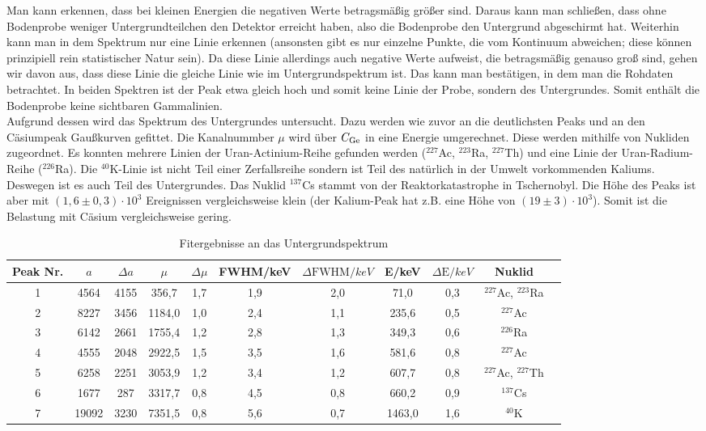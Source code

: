 Man kann erkennen, dass bei kleinen Energien die negativen Werte betragsmäßig größer sind. Daraus kann man schließen, dass ohne Bodenprobe weniger Untergrundteilchen den Detektor erreicht haben, also die Bodenprobe den Untergrund abgeschirmt hat. Weiterhin kann man in dem Spektrum nur eine Linie erkennen (ansonsten gibt es nur einzelne Punkte, die vom Kontinuum abweichen; diese können prinzipiell rein statistischer Natur sein). Da diese Linie allerdings auch negative Werte aufweist, die betragsmäßig genauso groß sind, gehen wir davon aus, dass diese Linie die gleiche Linie wie im Untergrundspektrum ist. Das kann man bestätigen, in dem man die Rohdaten betrachtet. In beiden Spektren ist der Peak etwa gleich hoch und somit keine Linie der Probe, sondern des Untergrundes. Somit enthält die Bodenprobe keine sichtbaren Gammalinien.\\

Aufgrund dessen wird das Spektrum des Untergrundes untersucht. Dazu werden wie zuvor an die deutlichsten Peaks und an den Cäsiumpeak Gaußkurven gefittet. Die Kanalnummber $\mu$ wird über $C_\mathrm{Ge}$ in eine Energie umgerechnet. Diese werden mithilfe von \cite{lara} Nukliden zugeordnet. Es konnten mehrere Linien der Uran-Actinium-Reihe gefunden werden ($^{227}$Ac, $^{223}$Ra, $^{227}$Th) und eine Linie der Uran-Radium-Reihe ($^{226}$Ra). Die $^{40}$K-Linie ist nicht Teil einer Zerfallsreihe sondern ist Teil des natürlich in der Umwelt vorkommenden Kaliums. Deswegen ist es auch Teil des Untergrundes. Das Nuklid $^{137}$Cs stammt von der Reaktorkatastrophe in Tschernobyl. Die Höhe des Peaks ist aber mit $(1,6 \pm 0,3) \cdot 10^3$ Ereignissen vergleichsweise klein (der Kalium-Peak hat z.B. eine Höhe von $(19 \pm 3)\cdot 10^3$). Somit ist die Belastung mit Cäsium vergleichsweise gering.

\begin{table}[h]
\small
\centering
\caption{Fitergebnisse an das Untergrundspektrum}
\begin{tabular}{ccccccccccc}
\toprule
Peak Nr. & $a$ & $\Delta a$ & $\mu$ & $\Delta \mu$ & FWHM/\si{keV} & $\Delta \text{FWHM}/\si{keV}$& E/\si{keV}& $\Delta\text{E}/\si{keV}$ & Nuklid\\
\midrule 
1	&	4564	&	4155	&	356,7	&	1,7	&	1,9	&	2,0	&	71,0	&	0,3	&	$^{227}$Ac, $^{223}$Ra\\
2	&	8227	&	3456	&	1184,0	&	1,0	&	2,4	&	1,1	&	235,6	&	0,5	&	$^{227}$Ac\\
3	&	6142	&	2661	&	1755,4	&	1,2	&	2,8	&	1,3	&	349,3	&	0,6	&	$^{226}$Ra \\
4	&	4555	&	2048	&	2922,5	&	1,5	&	3,5	&	1,6	&	581,6	&	0,8	&	$^{227}$Ac \\
5	&	6258	&	2251	&	3053,9	&	1,2	&	3,4	&	1,2	&	607,7	&	0,8	&	$^{227}$Ac, $^{227}$Th\\
6	&	1677	&	287	&	3317,7	&	0,8	&	4,5	&	0,8	&	660,2	&	0,9	&	$^{137}$Cs \\
7	&	19092	&	3230	&	7351,5	&	0,8	&	5,6	&	0,7	&	1463,0	&	1,6	&	$^{40}$K \\
\bottomrule
\end{tabular}
\label{tab:ge}
\end{table}
